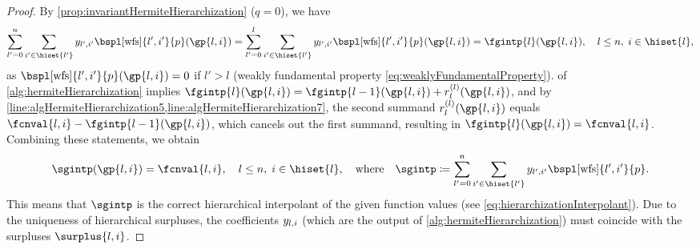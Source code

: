 \corAlgHermiteHierarchizationCorrectness*

\begin{proof}
  By \cref{prop:invariantHermiteHierarchization} ($q = 0$), we have
  \begin{equation}
    \sum_{l'=0}^n \sum_{i' \in \hiset{l'}}
    \linout{l',i'} \bspl[\wfs]{l',i'}{p}(\gp{l,i})
    = \sum_{l'=0}^l \sum_{i' \in \hiset{l'}}
    \linout{l',i'} \bspl[\wfs]{l',i'}{p}(\gp{l,i})
    = \fgintp{l}(\gp{l,i}),\quad
    l \le n,\; i \in \hiset{l},
  \end{equation}
  as $\bspl[\wfs]{l',i'}{p}(\gp{l,i}) = 0$ if $l' > l$
  (weakly fundamental property \eqref{eq:weaklyFundamentalProperty}).
   of
  \cref{alg:hermiteHierarchization} implies
  $\fgintp{l}(\gp{l,i})
  = \fgintp{l-1}(\gp{l,i}) + r^{(l)}_l(\gp{l,i})$, and by
  \cref{line:algHermiteHierarchization5,line:algHermiteHierarchization7},
  the second summand $r^{(l)}_l(\gp{l,i})$ equals
  $\fcnval{l,i} - \fgintp{l-1}(\gp{l,i})$,
  which cancels out the first summand, resulting in
  $\fgintp{l}(\gp{l,i}) = \fcnval{l,i}$.
  Combining these statements, we obtain
  \begin{equation}
    \sgintp(\gp{l,i})
    = \fcnval{l,i},\quad
    l \le n,\; i \in \hiset{l},
    \quad\text{where}\quad
    \sgintp
    \ceq \sum_{l'=0}^n \sum_{i' \in \hiset{l'}}
    \linout{l',i'} \bspl[\wfs]{l',i'}{p}.
  \end{equation}
  This means that $\sgintp$ is the correct hierarchical interpolant
  of the given function values
  (see \cref{eq:hierarchizationInterpolant}).
  Due to the uniqueness of hierarchical surpluses,
  the coefficients $\linout{l,i}$
  (which are the output of \cref{alg:hermiteHierarchization})
  must coincide with the surpluses $\surplus{l,i}$.
\end{proof}
